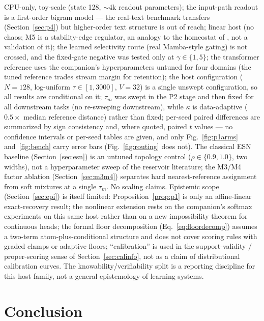 \documentclass[preprint,12pt]{elsarticle}
\begin{document}
CPU-only, toy-scale (state 128, $\sim$4k readout parameters); the
input-path readout is a first-order bigram model --- the real-text
benchmark transfers (Section~\ref{sec:p4}) but higher-order text
structure is out of reach; linear host (no chaos; M5 is a
stability-edge regulator, an analogy to the
homeostat of \cite{redema,redemb}, not a validation of it); the learned
selectivity route (real Mamba-style gating) is not crossed, and the
fixed-gate negative was tested only at $\gamma \in \{1,5\}$; the
transformer reference uses the companion's hyperparameters untuned for
four domains (the tuned reference trades stream margin for retention);
the host configuration ($N=128$, log-uniform $\tau \in [1,3000]$,
$V=32$) is a single unswept configuration, so all results are
conditional on it; $\tau_m$ was swept in the P2 stage and then fixed
for all downstream tasks (no re-sweeping downstream), while $\kappa$ is
data-adaptive ($0.5 \times$ median reference distance) rather than
fixed; per-seed paired differences are summarized by sign consistency
and, where quoted, paired $t$ values --- no confidence intervals or
per-seed tables are given, and only Fig.~\ref{fig:p1arms}
and~\ref{fig:bench} carry error bars (Fig.~\ref{fig:routing} does not).
The classical ESN baseline (Section~\ref{sec:esn}) is an untuned
topology control ($\rho\in\{0.9,1.0\}$, two widths), not a hyperparameter
sweep of the reservoir literature; the M3/M4 factor ablation
(Section~\ref{sec:m3m4}) separates hard nearest-reference assignment
from soft mixtures at a single $\tau_m$. No scaling claims.
Epistemic scope (Section~\ref{sec:epi}) is itself limited:
Proposition~\ref{prop:p1} is only an affine-linear exact-recovery
result; the nonlinear extension rests on the companion's softmax
experiments on this same host rather than on a new impossibility
theorem for continuous heads; the formal floor decomposition
(Eq.~\eqref{eq:floordecomp}) assumes a two-term atom-plus-conditional
structure and does not cover scoring rules with graded clamps or
adaptive floors; ``calibration'' is used in the support-validity /
proper-scoring sense of Section~\ref{sec:calinfo}, not as a claim of
distributional calibration curves. The knowability/verifiability split
is a reporting discipline for this host family, not a general
epistemology of learning systems.

\section{Conclusion}
\end{document}
